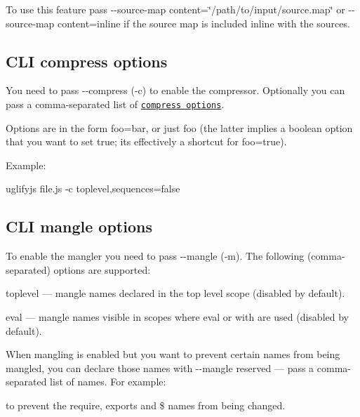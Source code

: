 To use this feature pass {\ttfamily -\/-\/source-\/map content=\char`\"{}/path/to/input/source.\+map\char`\"{}} or {\ttfamily -\/-\/source-\/map content=inline} if the source map is included inline with the sources.

\subsection*{C\+LI compress options}

You need to pass {\ttfamily -\/-\/compress} ({\ttfamily -\/c}) to enable the compressor. Optionally you can pass a comma-\/separated list of \href{#compress-options}{\tt compress options}.

Options are in the form {\ttfamily foo=bar}, or just {\ttfamily foo} (the latter implies a boolean option that you want to set {\ttfamily true}; it\textquotesingle{}s effectively a shortcut for {\ttfamily foo=true}).

Example\+: \begin{DoxyVerb}uglifyjs file.js -c toplevel,sequences=false
\end{DoxyVerb}


\subsection*{C\+LI mangle options}

To enable the mangler you need to pass {\ttfamily -\/-\/mangle} ({\ttfamily -\/m}). The following (comma-\/separated) options are supported\+:


\begin{DoxyItemize}
\item {\ttfamily toplevel} — mangle names declared in the top level scope (disabled by default).
\item {\ttfamily eval} — mangle names visible in scopes where {\ttfamily eval} or {\ttfamily with} are used (disabled by default).
\end{DoxyItemize}

When mangling is enabled but you want to prevent certain names from being mangled, you can declare those names with {\ttfamily -\/-\/mangle reserved} — pass a comma-\/separated list of names. For example\+: 


to prevent the {\ttfamily require}, {\ttfamily exports} and {\ttfamily \$} names from being changed.

